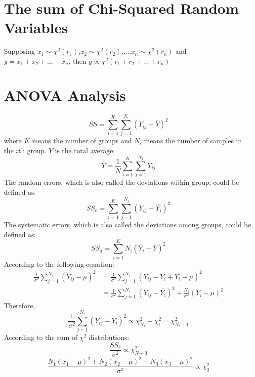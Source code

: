 \documentclass{article}
\begin{document}
\section{The sum of Chi-Squared Random Variables}
Supposing $x_{1} \sim \chi^{2}(r_{1})$,$x_{2} \sim \chi^{2}(r_{2})$,...,$x_{n} \sim \chi^{2}(r_{n})$ and $y=x_{1}+x_{2}+
...+x_{n}$, then $y\propto \chi^{2}(r_{1}+r_{2}+...+r_{n})$
\section{ANOVA Analysis}
\begin{equation}
SS=\sum_{i=1}^{K}\sum_{j=1}^{N_{i}}(Y_{ij}-\bar{Y})^2
\end{equation}
where $K$ means the number of groups and $N_{i}$ means the number of samples in the $i$th group. $\bar{Y}$ is the total average:
\begin{equation}
    \bar{Y}=\frac{1}{N}\sum_{i=1}^{K}\sum_{j=1}^{N_{i}}Y_{ij}
\end{equation}
The random errors, which is also called the deviations within group, could be defined as:
\begin{equation}
    SS_{e}=\sum_{i=1}^{K}\sum_{j=1}^{N_{j}}(Y_{ij}-\bar{Y_{i}})^{2}
\end{equation}
The systematic errors, which is also called the deviations among groups, could be defined as:
\begin{equation}
    SS_{a}=\sum_{i=1}^{K}N_{i}(\bar{Y_{i}}-\bar{Y})^2
\end{equation}
According to the following equation:
\begin{equation}
    \begin{split}
    \frac{1}{\sigma^{2}}\sum_{j=1}^{N_{i}}(Y_{ij}-\mu)^{2}&=\frac{1}{\sigma^{2}}\sum_{j=1}^{N_{i}}(Y_{ij}-\bar{Y_{i}}+
    \bar{Y_{i}}-\mu)^{2}\\
    &=\frac{1}{\sigma^{2}}\sum_{j=1}^{N_{i}}(Y_{ij}-\bar{Y_{i}})^{2}+\frac{N_{i}}{\sigma^{2}}(Y_{i}-\mu)^{2}
    \end{split}
\end{equation}
Therefore,
\begin{equation}
    \frac{1}{\sigma^{2}}\sum_{j=1}^{N_{i}}(Y_{ij}-\bar{Y_{i}})^{2}\propto\chi_{N_{i}}^{2}-\chi_{1}^{2}=\chi_{N_{i}-1}^{2}
\end{equation}
According to the sum of $\chi^{2}$ distributions:
\begin{equation}
    \frac{SS_{e}}{\sigma^{2}}\propto \chi_{N-3}^{2}
\end{equation}
\begin{equation}
    \frac{N_{1}(\bar{x_{1}}-\mu)^{2}+N_{2}(\bar{x_{2}}-\mu)^{2}+N_{3}(\bar{x_{3}}-\mu)^{2}}{\sigma^{2}}\propto \chi_{3}^{2}
\end{equation}
\end{document}
